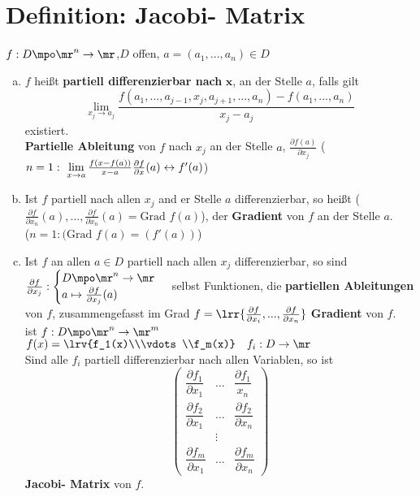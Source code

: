 \section{Definition: Jacobi- Matrix}
	$ f:D\mpo\mr^n\rightarrow\mr $,$ D $ offen, $ a=(a_1,...,a_n)\in D $
	\begin{enumerate}[a)]
		\item $ f $ heißt \textbf{partiell differenzierbar nach }$ \mathbf{x} $, an der Stelle $ a $, falls gilt
		\[ \lim\limits_{x_j\rightarrow a_j}\dfrac{f(a_1,...,a_{j-1},x_j,a_{j+1},...,a_n)-f(a_1,...,a_n)}{x_j-a_j} \]
		existiert.\\
		\textbf{Partielle Ableitung} von $ f $ nach $ x_j $ an der Stelle $ a $, $ \frac{\partial f(a)}{\partial x_j} $ ($ n=1:\ \lim\limits_{x\rightarrow a}\frac{f(x-f(a))}{x-a}\\
		\frac{\partial f}{\partial x}(a)\leftrightarrow f'(a)$)
		
		\item  Ist $ f $ partiell nach allen $ x_j $ and er Stelle $ a $ differenzierbar, so heißt ($ \frac{\partial f}{\partial x_n}(a),...,\frac{\partial f}{\partial x_n}(a)=\mbox{Grad }f(a) $), der \textbf{Gradient} von $ f $ an der Stelle $ a $.\\
		($ n=1:(\mbox{Grad }f(a)=(f'(a)) $)
		
		\item  Ist $ f $ an allen $ a\in D $ partiell nach allen $ x_j $ differenzierbar, so sind $ \frac{\partial f}{\partial x_j}:\begin{cases}D\mpo\mr^n\rightarrow\mr\\ a\mapsto\frac{\partial f}{\partial x_j}(a)\end{cases} $ selbst Funktionen, die \textbf{partiellen Ableitungen} von $ f $, zusammengefasst im Grad $ f=\lrr{\frac{\partial f}{\partial x_i},...,\frac{\partial f}{\partial x_n}} $ \textbf{Gradient} von $ f $.\\
		ist $ f:D\mpo\mr^n\rightarrow\mr^m $ $ f(x)=\lrv{f_1(x)\\\vdots\\f_m(x)}\quad f_i:D\rightarrow\mr $\\
		Sind alle $ f_i $ partiell differenzierbar nach allen Variablen, so ist
		\[
		\begin{pmatrix}
		\dfrac{\partial f_1}{\partial x_1}&...&\dfrac{\partial f_1}{x_n}\\
		\dfrac{\partial f_2}{\partial x_1}&...&\dfrac{\partial f_2}{\partial x_n}\\
		&\vdots&\\
		\dfrac{\partial f_m}{\partial x_1}&...&\dfrac{\partial f_m}{\partial x_n}
		\end{pmatrix}
		\]
		\textbf{Jacobi- Matrix} von $ f $.
	\end{enumerate}

